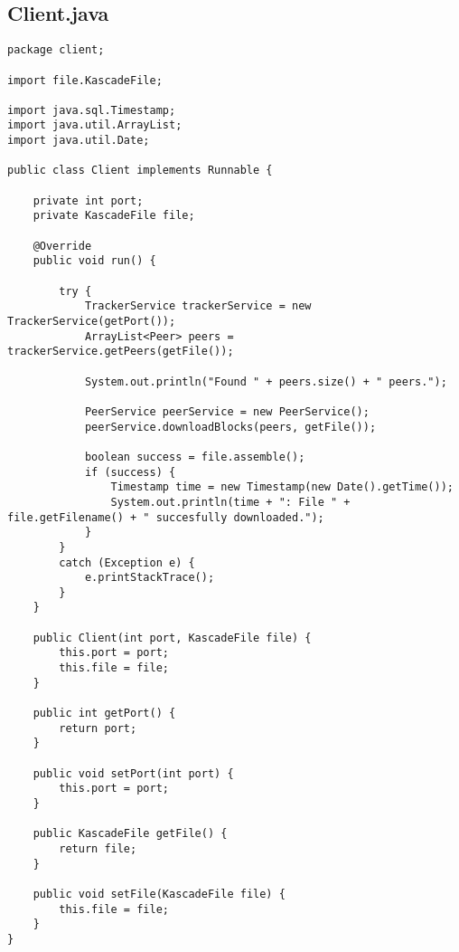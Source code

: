 \documentclass{acm_proc_article-sp}
\begin{document}
\subsection{Client.java}
\begin{lstlisting}
package client;

import file.KascadeFile;

import java.sql.Timestamp;
import java.util.ArrayList;
import java.util.Date;

public class Client implements Runnable {

    private int port;
    private KascadeFile file;

    @Override
    public void run() {

        try {
            TrackerService trackerService = new TrackerService(getPort());
            ArrayList<Peer> peers = trackerService.getPeers(getFile());

            System.out.println("Found " + peers.size() + " peers.");

            PeerService peerService = new PeerService();
            peerService.downloadBlocks(peers, getFile());

            boolean success = file.assemble();
            if (success) {
                Timestamp time = new Timestamp(new Date().getTime());
                System.out.println(time + ": File " + file.getFilename() + " succesfully downloaded.");
            }
        }
        catch (Exception e) {
            e.printStackTrace();
        }
    }

    public Client(int port, KascadeFile file) {
        this.port = port;
        this.file = file;
    }

    public int getPort() {
        return port;
    }

    public void setPort(int port) {
        this.port = port;
    }

    public KascadeFile getFile() {
        return file;
    }

    public void setFile(KascadeFile file) {
        this.file = file;
    }
}
\end{lstlisting}
\end{document}
